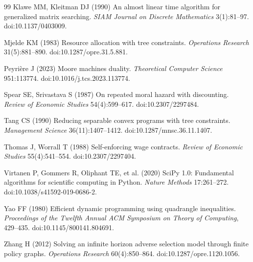 \begin{thebibliography}{99}
Klawe MM, Kleitman DJ (1990) An almost linear time algorithm for generalized matrix searching. \emph{SIAM Journal on Discrete Mathematics} 3(1):81--97. doi:10.1137/0403009.

Mjelde KM (1983) Resource allocation with tree constraints. \emph{Operations Research} 31(5):881--890. doi:10.1287/opre.31.5.881.

Peyri\`ere J (2023) Moore machines duality. \emph{Theoretical Computer Science} 951:113774. doi:10.1016/j.tcs.2023.113774.

Spear SE, Srivastava S (1987) On repeated moral hazard with discounting. \emph{Review of Economic Studies} 54(4):599--617. doi:10.2307/2297484.

Tang CS (1990) Reducing separable convex programs with tree constraints. \emph{Management Science} 36(11):1407--1412. doi:10.1287/mnsc.36.11.1407.

Thomas J, Worrall T (1988) Self-enforcing wage contracts. \emph{Review of Economic Studies} 55(4):541--554. doi:10.2307/2297404.

Virtanen P, Gommers R, Oliphant TE, et al. (2020) SciPy 1.0: Fundamental algorithms for scientific computing in Python. \emph{Nature Methods} 17:261--272. doi:10.1038/s41592-019-0686-2.

Yao FF (1980) Efficient dynamic programming using quadrangle inequalities. \emph{Proceedings of the Twelfth Annual ACM Symposium on Theory of Computing}, 429--435. doi:10.1145/800141.804691.

Zhang H (2012) Solving an infinite horizon adverse selection model through finite policy graphs. \emph{Operations Research} 60(4):850--864. doi:10.1287/opre.1120.1056.
\end{thebibliography}
